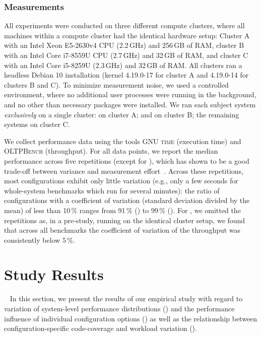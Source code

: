 {\subsubsection{Measurements}\label{sec:measurement_setup}
All experiments were conducted on three different compute clusters, where all machines within a compute cluster had the identical hardware setup: Cluster A with an Intel Xeon E5-2630v4 CPU (2.2\,GHz) and 256\,GB of RAM, cluster B  with an Intel Core i7-8559U CPU (2.7\,GHz) and 32\,GB of RAM, and cluster C with an Intel Core i5-8259U (2.3\,GHz) and 32\,GB of RAM. All clusters ran a headless Debian 10 installation (kernel 4.19.0-17 for cluster A and 4.19.0-14 for clusters B and C). To minimize measurement noise, we used a controlled environment, where no additional user processes were running in the background, and no other than necessary packages were installed. 
We ran each subject system \textit{exclusively} on a single cluster: \htwo on cluster A; \dconvert and \batik on cluster B; the remaining systems on cluster C.

{\color{brown}We collect performance data using the tools \textsc{GNU time} (execution time) and \textsc{OLTPBench} (throughput).} For all data points, we report the median {\color{brown}performance} across five repetitions (except for \htwo), which has shown to be a good trade-off between variance and measurement effort~\cite{molyneauxArtApplicationPerformance2015}. 
{\color{brown}Across these repetitions, most configurations exhibit only little variation (e.g., only a few seconds for whole-system benchmarks which run for several minutes): the ratio of configurations with a coefficient of variation (standard deviation divided by the mean) of less than 10\,\% ranges from 91\,\% (\lrzip) to 99\,\% (\xzwo).}
For \htwo, we omitted the repetitions as, in a pre-study, running on the identical cluster setup, we found that across all benchmarks the coefficient of variation of the throughput was consistently below 5\,\%.

\section{Study Results}~\label{sec:results}
In this section, we present the results of our empirical study with regard to variation of system-level performance distributions () and the performance influence of individual configuration options () as well as the relationship between configuration-specific code-coverage and workload variation (). 

}
